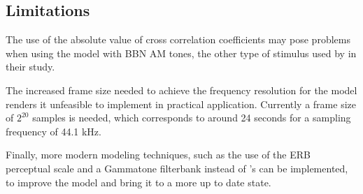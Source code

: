 \documentclass[../main.tex]{subfiles}
\begin{document}
\subsection{Limitations}

The use of the absolute value of cross correlation coefficients may pose
problems when using the model with \gls{BBN} \gls{AM} tones, the other type
of stimulus used by \citeauthor{Fastl2007Psychoacoustics} in their study.

The increased frame size needed to achieve the frequency resolution for the
model renders it unfeasible to implement in practical application. Currently
a frame size of $2^20$ samples is needed, which corresponds to around 24 seconds
for a sampling frequency of 44.1 kHz.

Finally, more modern modeling techniques, such as the use of the ERB perceptual
scale and a Gammatone filterbank instead of \citeauthor{Terhardt1979}'s can be
implemented, to improve the model and bring it to a more up to date state.
\end{document}
